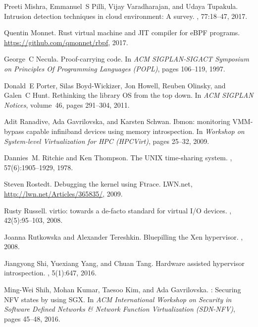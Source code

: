 \documentclass[11pt]{article}
\begin{document}
\begin{thebibliography}{10}
\begin{small}
  Preeti Mishra, Emmanuel~S Pilli, Vijay Varadharajan, and Udaya Tupakula.
  \newblock Intrusion detection techniques in cloud environment: A survey.
  , 77:18--47, 2017.
  
  Quentin Monnet.
  \newblock Rust virtual machine and {JIT} compiler for {eBPF} programs.
  \newblock \url{https://github.com/qmonnet/rbpf}, 2017.
  
  George~C Necula.
  \newblock Proof-carrying code.
  \newblock In {\em ACM SIGPLAN-SIGACT Symposium on Principles Of Programming
    Languages (POPL)}, pages 106--119, 1997.
  
  Donald~E Porter, Silas Boyd-Wickizer, Jon Howell, Reuben Olinsky, and Galen~C
    Hunt.
  \newblock Rethinking the library {OS} from the top down.
  \newblock In {\em ACM SIGPLAN Notices}, volume~46, pages 291--304, 2011.
  
  Adit Ranadive, Ada Gavrilovska, and Karsten Schwan.
  \newblock Ibmon: monitoring {VMM}-bypass capable infiniband devices using
    memory introspection.
  \newblock In {\em Workshop on System-level Virtualization for HPC (HPCVirt)},
    pages 25--32, 2009.
  
  Dannies~M. Ritchie and Ken Thompson.
  \newblock The {UNIX} time-sharing system.
  , 57(6):1905--1929, 1978.
  
  Steven Rostedt.
  \newblock Debugging the kernel using {Ftrace}.
  \newblock LWN.net, \url{http://lwn.net/Articles/365835/}, 2009.
  
  Rusty Russell.
  \newblock virtio: towards a de-facto standard for virtual {I/O} devices.
  , 42(5):95--103, 2008.
  
  Joanna Rutkowska and Alexander Tereshkin.
  \newblock Bluepilling the {X}en hypervisor.
  , 2008.
  
  Jiangyong Shi, Yuexiang Yang, and Chuan Tang.
  \newblock Hardware assisted hypervisor introspection.
  , 5(1):647, 2016.
  
  Ming-Wei Shih, Mohan Kumar, Taesoo Kim, and Ada Gavrilovska.
  : Securing {NFV} states by using {SGX}.
  \newblock In {\em ACM International Workshop on Security in Software Defined
    Networks \& Network Function Virtualization (SDN-NFV)}, pages 45--48, 2016.
  

\end{small}
\end{thebibliography}
\end{document}
